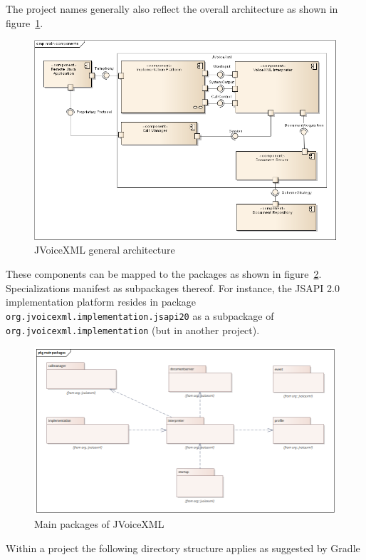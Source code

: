 \documentclass[11pt,a4paper]{article}
\begin{document}
The project names generally also reflect the overall architecture as shown in
figure~\ref{fig:main-components}.
\begin{figure}
\includegraphics[width=\linewidth]{main-components.png}
\caption{JVoiceXML general architecture}
\label{fig:main-components}
\end{figure}
These components can be mapped to the packages as shown in
figure~\ref{fig:main-packages}. Specializations manifest as subpackages thereof.
For instance, the JSAPI 2.0 implementation platform resides in package 
\lstinline{org.jvoicexml.implementation.jsapi20} as a subpackage of
\lstinline{org.jvoicexml.implementation} (but in another project).
\begin{figure}
\includegraphics[width=\linewidth]{main-packages.png}
\caption{Main packages of JVoiceXML}
\label{fig:main-packages}
\end{figure}


Within a project the following directory structure applies as suggested by
Gradle
\end{document}
